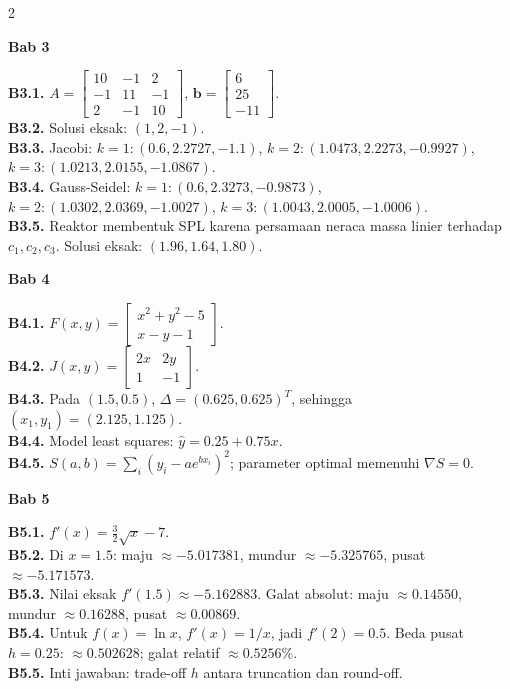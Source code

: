 \documentclass[10pt,a4paper]{article}
\begin{document}
\begin{multicols}{2}
\begin{chapterbox}{\color{white}\bfseries Bab 3}\end{chapterbox}
\textbf{B3.1.} \(A=\begin{bmatrix}10&-1&2\\-1&11&-1\\2&-1&10\end{bmatrix}\), \(\mathbf b=\begin{bmatrix}6\\25\\-11\end{bmatrix}\).\\
\textbf{B3.2.} Solusi eksak: \((1,2,-1)\).\\
\textbf{B3.3.} Jacobi: \(k=1:(0.6,2.2727,-1.1)\), \(k=2:(1.0473,2.2273,-0.9927)\), \(k=3:(1.0213,2.0155,-1.0867)\).\\
\textbf{B3.4.} Gauss-Seidel: \(k=1:(0.6,2.3273,-0.9873)\), \(k=2:(1.0302,2.0369,-1.0027)\), \(k=3:(1.0043,2.0005,-1.0006)\).\\
\textbf{B3.5.} Reaktor membentuk SPL karena persamaan neraca massa linier terhadap \(c_1,c_2,c_3\). Solusi eksak: \((1.96,1.64,1.80)\).

\begin{chapterbox}{\color{white}\bfseries Bab 4}\end{chapterbox}
\textbf{B4.1.} \(F(x,y)=\begin{bmatrix}x^2+y^2-5\\x-y-1\end{bmatrix}\).\\
\textbf{B4.2.} \(J(x,y)=\begin{bmatrix}2x&2y\\1&-1\end{bmatrix}\).\\
\textbf{B4.3.} Pada \((1.5,0.5)\), \(\Delta=(0.625,0.625)^T\), sehingga \((x_1,y_1)=(2.125,1.125)\).\\
\textbf{B4.4.} Model least squares: \(\hat y=0.25+0.75x\).\\
\textbf{B4.5.} \(S(a,b)=\sum_i(y_i-ae^{bx_i})^2\); parameter optimal memenuhi \(\nabla S=0\).

\begin{chapterbox}{\color{white}\bfseries Bab 5}\end{chapterbox}
\textbf{B5.1.} \(f'(x)=\frac{3}{2}\sqrt{x}-7\).\\
\textbf{B5.2.} Di \(x=1.5\): maju \(\approx-5.017381\), mundur \(\approx-5.325765\), pusat \(\approx-5.171573\).\\
\textbf{B5.3.} Nilai eksak \(f'(1.5)\approx-5.162883\). Galat absolut: maju \(\approx0.14550\), mundur \(\approx0.16288\), pusat \(\approx0.00869\).\\
\textbf{B5.4.} Untuk \(f(x)=\ln x\), \(f'(x)=1/x\), jadi \(f'(2)=0.5\). Beda pusat \(h=0.25\): \(\approx0.502628\); galat relatif \(\approx0.5256\%\).\\
\textbf{B5.5.} Inti jawaban: trade-off \(h\) antara truncation dan round-off.


\end{multicols}
\end{document}
